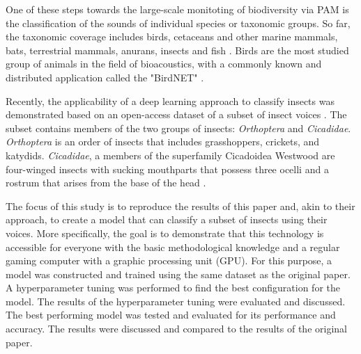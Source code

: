 One of these steps towards the large-scale monitoting of biodiversity via PAM is the classification of the sounds of individual species or taxonomic groups.
So far, the taxonomic coverage includes birds, cetaceans and other marine mammals, bats, terrestrial mammals,
anurans, insects and fish \autocite[4]{stowellComputationalBioacousticsDeep2022}.
Birds are the most studied group of animals in the field of bioacoustics, with a
commonly known and distributed application called the "BirdNET" \autocite{kahlBirdNETDeepLearning2021}.

Recently, the applicability of a deep learning approach to classify insects was demonstrated based on an open-access dataset of a subset of insect voices \autocite{faissInsectSet32DatasetAutomatic2022}.
The subset contains members of the two groups of insects: \textit{Orthoptera} and \textit{Cicadidae}.
\textit{Orthoptera} is an order of insects that includes grasshoppers, crickets, and katydids. \autocite{capineraOrthoptera2008}
\textit{Cicadidae}, a members of the superfamily Cicadoidea Westwood are four-winged insects with sucking 
mouthparts that possess three ocelli and a rostrum that arises from the base of the head \autocite{sanbornCicadasHemipteraCicadoidea2008}.

The focus of this study is to reproduce the results of this paper and, akin to their approach, to create a model 
that can classify a subset of insects using their voices.
More specifically, the goal is to demonstrate that this technology is accessible for everyone with the basic methodological knowledge and a 
regular gaming computer with a graphic processing unit (GPU). For this purpose, a model was
constructed and trained using the same dataset as the original paper. A hyperparameter tuning was performed to find the best
configuration for the model. The results of the hyperparameter tuning were evaluated and discussed.
The best performing model was tested and evaluated for its performance and accuracy. The results were
discussed and compared to the results of the original paper.

